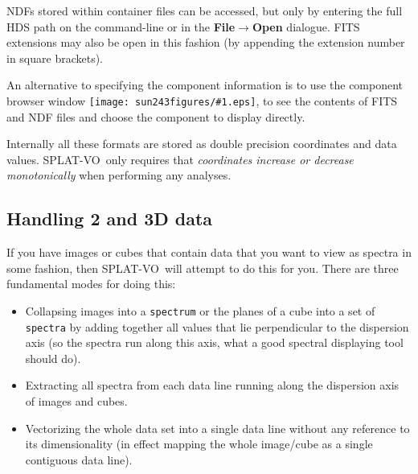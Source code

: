 \documentclass[twoside,11pt]{article}
\newcommand{\htmladdimg}[1]{}
\newcommand{\latexhtml}[2]{#1}
\renewcommand{\_}{\texttt{\symbol{95}}}
\newcommand{\SPLAT}{\textsf{SPLAT-VO}}
\newcommand{\inline}[1]
        {\latexhtml{\texttt{[image: sun243\_figures/\#1.eps]}}
        {\htmladdimg[align=center]{#1.gif}}}
\newcommand{\submenuitem}[2]{\latexhtml{\textbf{#1$\rightarrow$#2}}{\textbf{#1->#2}}}
\newcommand{\hitext}[1]{\texttt{#1}}
\begin{document}
NDFs stored within container files can be accessed, but only by entering the
full HDS path on the command-line or in the \submenuitem{File}{Open} dialogue.
FITS extensions may also be open in this fashion (by appending the extension
number in square brackets).

An alternative to specifying the component information is to use the component
browser window \inline{browse}, to see the contents of FITS and NDF files and
choose the component to display directly.

Internally all these formats are stored as double precision
coordinates and data values. \SPLAT\ only requires that
\textit{coordinates increase or decrease monotonically}
when performing any analyses.

\subsection{Handling 2 and 3D data}

If you have images or cubes that contain data that you want to view as spectra
in some fashion, then \SPLAT\ will attempt to do this for you. There are three
fundamental modes for doing this:
\begin{itemize}

\item Collapsing images into a \hitext{spectrum} or the planes of a cube into
a set of \hitext{spectra} by adding together all values that lie perpendicular
to the dispersion axis (so the spectra run along this axis, what a good
spectral displaying tool should do).

\item Extracting all spectra from each data line running along the
dispersion axis of images and cubes.

\item Vectorizing the whole data set into a single data line without any
reference to its dimensionality (in effect mapping the whole image/cube as a
single contiguous data line).

\end{itemize}
\end{document}
